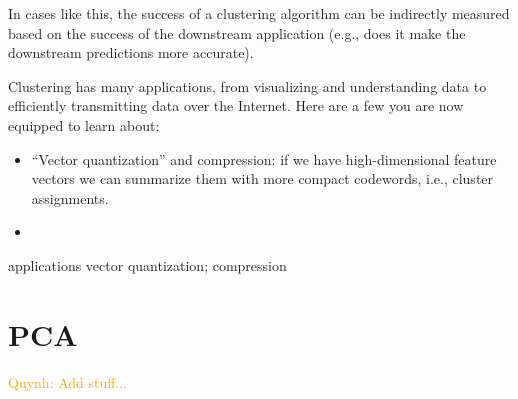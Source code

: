\documentclass[11pt]{article}
\newcommand{\qn}[1]{\textcolor{orange}{Quynh: #1}}
\begin{document}
In cases like this, the success of a clustering algorithm can be indirectly measured based on the success of the downstream application (e.g., does it make the downstream predictions more accurate).




Clustering has many applications, from visualizing and understanding data to efficiently transmitting data over the Internet. Here are a few you are now equipped to learn about:
\begin{itemize}
    \item ``Vector quantization'' and compression: if we have high-dimensional feature vectors we can summarize them with more compact codewords, i.e., cluster assignments. 
    \item 
\end{itemize}

applications
 vector quantization; compression


\section{PCA}
\qn{Add stuff...}
\end{document}
